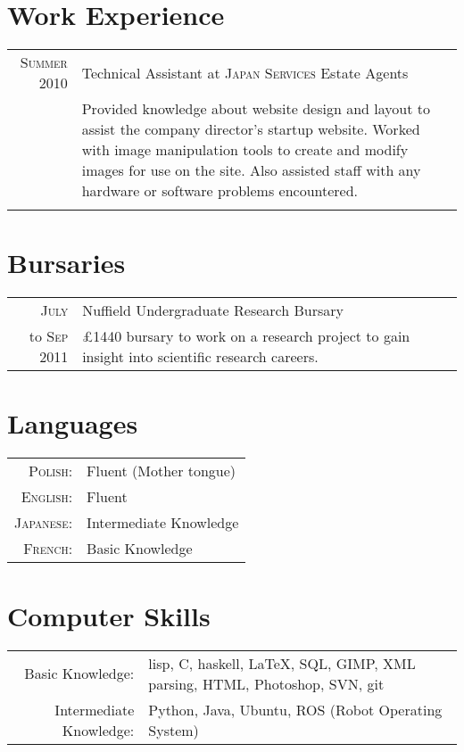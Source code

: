 \documentclass[a4paper,10pt]{article}
\begin{document}
\section{Work Experience}
\begin{tabular}{r|p{11cm}}
  \textsc{Summer 2010}& Technical Assistant at \textsc{Japan Services} Estate Agents\\
  &\footnotesize{Provided knowledge about website design and layout to assist the company director's startup website. Worked with image manipulation tools to create and modify images for use on the site. Also assisted staff with any hardware or software problems encountered.}\\\multicolumn{2}{c}{} \\
\end{tabular}

\section{Bursaries}
\begin{tabular}{r|p{11cm}}
  \textsc{July} & Nuffield Undergraduate Research Bursary\\
  to \textsc{Sep 2011}&\footnotesize{£1440 bursary to work on a research project to gain insight into scientific research careers.}
\end{tabular}

\section{Languages}
\begin{tabular}{rl}
  \textsc{Polish:}& Fluent (Mother tongue)\\
  \textsc{English:}&Fluent\\
  \textsc{Japanese:}&Intermediate Knowledge\\
  \textsc{French:}&Basic Knowledge\\
\end{tabular}

\section{Computer Skills}
\begin{tabular}{rp{9cm}}
  Basic Knowledge:& lisp, C, haskell, \LaTeX, SQL, GIMP, XML parsing, HTML, Photoshop, SVN, git\\
  Intermediate Knowledge:& Python, Java, Ubuntu, ROS (Robot Operating System)
\end{tabular}
\end{document}
